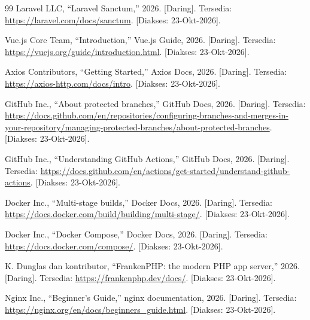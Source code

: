 \documentclass[a4paper,oneside,12pt]{report}
\begin{document}
\begin{thebibliography}{99}
Laravel LLC, ``Laravel Sanctum,'' 2026. [Daring]. Tersedia: \url{https://laravel.com/docs/sanctum}. [Diakses: 23-Okt-2026].

Vue.js Core Team, ``Introduction,'' Vue.js Guide, 2026. [Daring]. Tersedia: \url{https://vuejs.org/guide/introduction.html}. [Diakses: 23-Okt-2026].

Axios Contributors, ``Getting Started,'' Axios Docs, 2026. [Daring]. Tersedia: \url{https://axios-http.com/docs/intro}. [Diakses: 23-Okt-2026].

GitHub Inc., ``About protected branches,'' GitHub Docs, 2026. [Daring]. Tersedia: \url{https://docs.github.com/en/repositories/configuring-branches-and-merges-in-your-repository/managing-protected-branches/about-protected-branches}. [Diakses: 23-Okt-2026].

GitHub Inc., ``Understanding GitHub Actions,'' GitHub Docs, 2026. [Daring]. Tersedia: \url{https://docs.github.com/en/actions/get-started/understand-github-actions}. [Diakses: 23-Okt-2026].

Docker Inc., ``Multi-stage builds,'' Docker Docs, 2026. [Daring]. Tersedia: \url{https://docs.docker.com/build/building/multi-stage/}. [Diakses: 23-Okt-2026].

Docker Inc., ``Docker Compose,'' Docker Docs, 2026. [Daring]. Tersedia: \url{https://docs.docker.com/compose/}. [Diakses: 23-Okt-2026].

K. Dunglas dan kontributor, ``FrankenPHP: the modern PHP app server,'' 2026. [Daring]. Tersedia: \url{https://frankenphp.dev/docs/}. [Diakses: 23-Okt-2026].

Nginx Inc., ``Beginner's Guide,'' nginx documentation, 2026. [Daring]. Tersedia: \url{https://nginx.org/en/docs/beginners_guide.html}. [Diakses: 23-Okt-2026].
\end{thebibliography}
\end{document}
